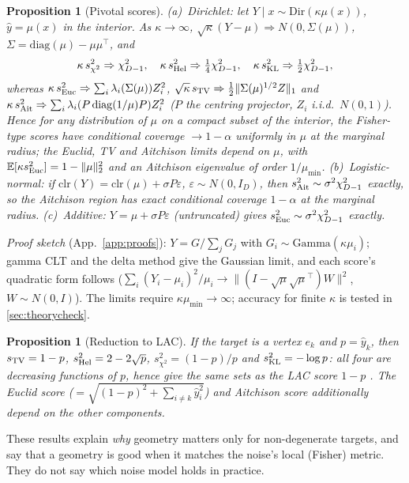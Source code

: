 \documentclass{article}
\theoremstyle{plain}
\newtheorem{proposition}[theorem]{Proposition}
\theoremstyle{remark}
\newcommand{\yh}{\hat y}
\newcommand{\E}{\mathbb{E}}
\newcommand{\chisq}{\chi^2}
\newcommand{\Dir}{\mathrm{Dir}}
\begin{document}
\begin{proposition}[Pivotal scores]\label{prop:pivot}
(a)~\emph{Dirichlet}: let $Y\mid x\sim\Dir(\kappa\mu(x))$, $\yh=\mu(x)$ in the interior. As $\kappa\to\infty$, $\sqrt\kappa(Y-\mu)\Rightarrow N(0,\Sigma(\mu))$, $\Sigma=\mathrm{diag}(\mu)-\mu\mu^\top$, and
\[
\kappa\,s_{\chisq}^2\Rightarrow\chisq_{D-1},\quad \kappa\,s_{\rm Hel}^2\Rightarrow\tfrac14\chisq_{D-1},\quad \kappa\,s_{\rm KL}^2\Rightarrow\tfrac12\chisq_{D-1},
\]
whereas $\kappa\,s_{\rm Euc}^2\Rightarrow\sum_i\lambda_i(\Sigma(\mu))Z_i^2$, $\sqrt\kappa\,s_{\rm TV}\Rightarrow\tfrac12\|\Sigma(\mu)^{1/2}Z\|_1$ and $\kappa\,s_{\rm Ait}^2\Rightarrow\sum_i\lambda_i(P\,\mathrm{diag}(1/\mu)P)Z_i^2$ ($P$ the centring projector, $Z_i$ i.i.d.\ $N(0,1)$). Hence for any distribution of $\mu$ on a compact subset of the interior, the Fisher-type scores have conditional coverage $\to1-\alpha$ uniformly in $\mu$ at the marginal radius; the Euclid, TV and Aitchison limits depend on $\mu$, with $\E[\kappa s_{\rm Euc}^2]=1-\|\mu\|_2^2$ and an Aitchison eigenvalue of order $1/\mu_{\min}$.
(b)~\emph{Logistic-normal}: if $\mathrm{clr}(Y)=\mathrm{clr}(\mu)+\sigma P\varepsilon$, $\varepsilon\sim N(0,I_D)$, then $s_{\rm Ait}^2\sim\sigma^2\chisq_{D-1}$ \emph{exactly}, so the Aitchison region has exact conditional coverage $1-\alpha$ at the marginal radius.
(c)~\emph{Additive}: $Y=\mu+\sigma P\varepsilon$ (untruncated) gives $s_{\rm Euc}^2\sim\sigma^2\chisq_{D-1}$ exactly.
\end{proposition}
\emph{Proof sketch} (App.~\ref{app:proofs}): $Y=G/\sum_jG_j$ with $G_i\sim\mathrm{Gamma}(\kappa\mu_i)$; gamma CLT and the delta method give the Gaussian limit, and each score's quadratic form follows ($\sum_i(Y_i-\mu_i)^2/\mu_i\to\|(I-\sqrt\mu\sqrt\mu^\top)W\|^2$, $W\sim N(0,I)$). The limits require $\kappa\mu_{\min}\to\infty$; accuracy for finite $\kappa$ is tested in \cref{sec:theorycheck}.

\begin{proposition}[Reduction to LAC]\label{prop:lac}
If the target is a vertex $e_k$ and $p=\yh_k$, then $s_{\rm TV}=1-p$, $s_{\rm Hel}^2=2-2\sqrt p$, $s_{\chisq}^2=(1-p)/p$ and $s_{\rm KL}^2=-\log p$: all four are decreasing functions of $p$, hence give the same sets as the LAC score $1-p$ \citep{sadinle2019}. The Euclid score ($=\sqrt{(1-p)^2+\sum_{i\ne k}\yh_i^2}$) and Aitchison score additionally depend on the other components.
\end{proposition}
These results explain \emph{why} geometry matters only for non-degenerate targets, and say that a geometry is good when it matches the noise's local (Fisher) metric. They do not say which noise model holds in practice.
\end{document}
